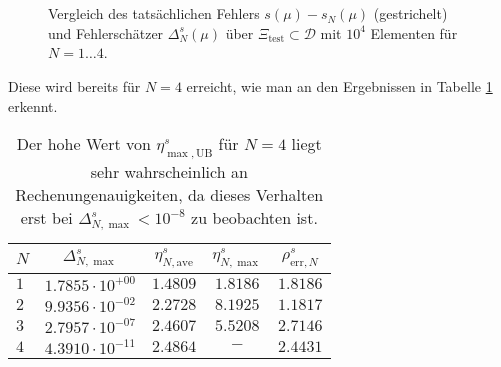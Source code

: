 \begin{figure}[tb]
    \begin{center}
        \tiny
        \newlength\figureheight
        \newlength\figurewidth
        \setlength\figureheight{5cm}
        \setlength{}
        \begin{subfigure}[b]{0.45\textwidth}
            ~
        \end{subfigure}
        \hfill
        \begin{subfigure}[b]{0.45\textwidth}
            ~
        \end{subfigure}

        \begin{subfigure}[b]{0.45\textwidth}
        \end{subfigure}
        \hfill
        \begin{subfigure}[b]{0.45\textwidth}
        \end{subfigure}
    \end{center}
    \caption{Vergleich des tatsächlichen Fehlers $s(\mu) - s_N(\mu)$ (gestrichelt) und Fehlerschätzer $\Delta^s_N(\mu)$ über $\Xi_\text{test} \subset \mathcal D$ mit $10^4$ Elementen für $N = 1 \ldots 4$.}
    \label{fig:plot_s_fehler}
\end{figure}

Diese wird bereits für $N = 4$ erreicht, wie man an den Ergebnissen in Tabelle \ref{tab:eindim} erkennt.

\begin{table}[tb]
    \begin{center}
        \begin{tabular}{l|cccc}
        $N$ & $\Delta^s_{N,\max}$ & $\eta^s_{N,\text{ave}}$ & $\eta^s_{N,\max}$ & $\rho^s_{\text{err}, N}$ \\
        \hline
            $1$ & $1.7855 \cdot 10^{+00}$ & $1.4809$ & $1.8186$ & $1.8186$ \\
            $2$ & $9.9356 \cdot 10^{-02}$ & $2.2728$ & $8.1925$ & $1.1817$ \\
            $3$ & $2.7957 \cdot 10^{-07}$ & $2.4607$ & $5.5208$ & $2.7146$ \\
            $4$ & $4.3910 \cdot 10^{-11}$ & $2.4864$ & $-$ & $2.4431$ \\
        \end{tabular}
        \caption{Der hohe Wert von $\eta^s_{\max,\text{UB}}$ für $N = 4$ liegt sehr wahrscheinlich an Rechenungenauigkeiten, da dieses Verhalten erst bei $\Delta^s_{N,\max} < 10^{-8}$ zu beobachten ist.}
        \label{tab:eindim}
    \end{center}
\end{table}

